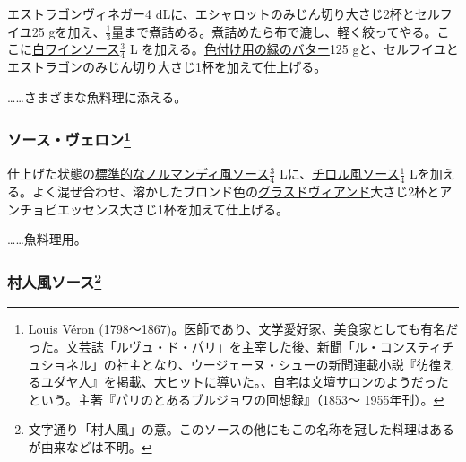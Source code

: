 \begin{recette}


エストラゴンヴィネガー4
dLに、エシャロットのみじん切り大さじ2杯とセルフイユ25
gを加え、\(\frac{1}{3}\)量まで煮詰める。煮詰めたら布で漉し、軽く絞ってやる。ここに\protect\hyperlink{sauce-vin-blanc}{白ワインソース}\(\frac{3}{4}\)
L
を加える。\protect\hyperlink{beurre-colorant-vert}{色付け用の緑のバター}125
gと、セルフイユとエストラゴンのみじん切り大さじ1杯を加えて仕上げる。

\ldots{}\ldots{}さまざまな魚料理に添える。

\atoaki{}

\hypertarget{sauce-veron}{%
\subsubsection[ソース・ヴェロン]{\texorpdfstring{ソース・ヴェロン\footnote{Louis
  Véron
  (1798〜1867)。医師であり、文学愛好家、美食家としても有名だった。文芸誌「ルヴュ・ド・パリ」を主宰した後、新聞「ル・コンスティチュショネル」の社主となり、ウージェーヌ・シューの新聞連載小説『彷徨えるユダヤ人』を掲載、大ヒットに導いた。、自宅は文壇サロンのようだったという。主著『パリのとあるブルジョワの回想録』（1853〜
  1955年刊）。}}{ソース・ヴェロン}}\label{sauce-veron}}


 
 

仕上げた状態の\protect\hyperlink{sauce-normande}{標準的なノルマンディ風ソース}\(\frac{3}{4}\)
Lに、\protect\hyperlink{sauce-tyrolienne}{チロル風ソース}\(\frac{1}{4}\)
Lを加える。よく混ぜ合わせ、溶かしたブロンド色の\protect\hyperlink{glace-de-viande}{グラスドヴィアンド}大さじ2杯とアンチョビエッセンス大さじ1杯を加えて仕上げる。

\ldots{}\ldots{}魚料理用。

\atoaki{}

\hypertarget{sauce-villageoise}{%
\subsubsection[村人風ソース]{\texorpdfstring{村人風ソース\footnote{文字通り「村人風」の意。このソースの他にもこの名称を冠した料理はあるが由来などは不明。}}{村人風ソース}}\label{sauce-villageoise}}


\end{recette}
